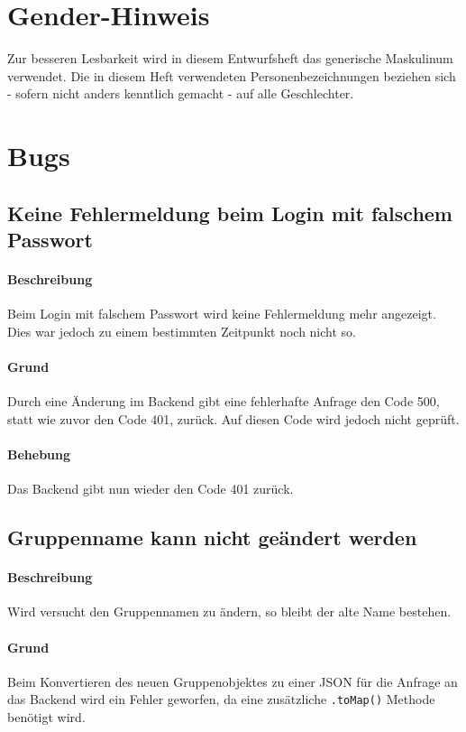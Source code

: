 \documentclass{qualitätssicherungsheft}
\begin{document}

\maketitle
\tableofcontents
\newpage

\section*{Gender-Hinweis}
Zur besseren Lesbarkeit wird in diesem Entwurfsheft das generische Maskulinum verwendet.
Die in diesem Heft verwendeten Personenbezeichnungen beziehen sich - sofern nicht anders kenntlich gemacht - auf alle Geschlechter.
\newpage
\section{Bugs}
\subsection{Keine Fehlermeldung beim Login mit falschem Passwort}
\paragraph*{Beschreibung} Beim Login mit falschem Passwort wird keine Fehlermeldung mehr angezeigt. Dies war jedoch zu einem bestimmten Zeitpunkt noch nicht so.
\paragraph{Grund} Durch eine Änderung im Backend
gibt eine fehlerhafte Anfrage den Code 500, statt wie zuvor den Code 401, zurück. Auf diesen Code wird jedoch nicht geprüft.
\paragraph{Behebung} Das Backend gibt nun wieder den Code 401 zurück.
\newpage
\subsection{Gruppenname kann nicht geändert werden}
\paragraph*{Beschreibung} Wird versucht den Gruppennamen zu ändern, so bleibt der alte Name bestehen.
\paragraph{Grund} Beim Konvertieren des neuen Gruppenobjektes zu einer JSON für die Anfrage an das Backend wird ein Fehler geworfen, da eine zusätzliche \texttt{.toMap()} Methode benötigt wird.
\end{document}
